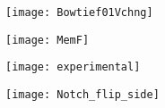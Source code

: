 \begin{figure}[!htp]
\centering
\texttt{[image: Bowtief01Vchng]}
\caption{} 
\label{}
\end{figure}

\begin{figure}[!htp]
\centering
\texttt{[image: MemF]}
\caption{} 
\label{}
\end{figure}

\begin{figure}[!htp]
\centering
\texttt{[image: experimental]}
\caption{} 
\label{}
\end{figure}

\begin{figure}[!htp]
\centering
\texttt{[image: Notch\_flip\_side]}
\caption{} 
\label{}
\end{figure}
